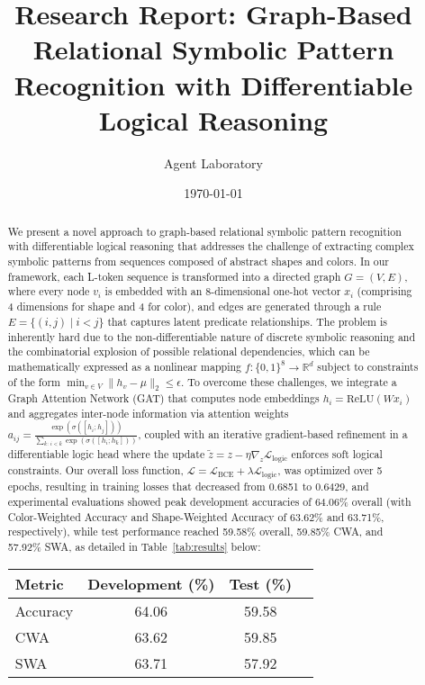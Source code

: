 \documentclass{article}
\title{Research Report: Graph-Based Relational Symbolic Pattern Recognition with Differentiable Logical Reasoning}
\author{Agent Laboratory}
\date{\today}
\begin{document}
\maketitle

\begin{abstract}
We present a novel approach to graph‐based relational symbolic pattern recognition with differentiable logical reasoning that addresses the challenge of extracting complex symbolic patterns from sequences composed of abstract shapes and colors. In our framework, each L-token sequence is transformed into a directed graph \( G = (V, E) \), where every node \( v_i \) is embedded with an 8-dimensional one-hot vector \( x_i \) (comprising 4 dimensions for shape and 4 for color), and edges are generated through a rule \( E = \{(i,j) \mid i < j\} \) that captures latent predicate relationships. The problem is inherently hard due to the non-differentiable nature of discrete symbolic reasoning and the combinatorial explosion of possible relational dependencies, which can be mathematically expressed as a nonlinear mapping \( f: \{0,1\}^8 \to \mathbb{R}^d \) subject to constraints of the form \( \min_{v \in V} \|h_v - \mu\|_2 \leq \epsilon \). To overcome these challenges, we integrate a Graph Attention Network (GAT) that computes node embeddings \( h_i = \text{ReLU}(W x_i) \) and aggregates inter-node information via attention weights \( a_{ij} = \frac{\exp(\sigma([h_i;h_j]))}{\sum_{k:\,i<k}\exp(\sigma([h_i;h_k]))} \), coupled with an iterative gradient-based refinement in a differentiable logic head where the update \( \tilde{z} = z - \eta \nabla_z \mathcal{L}_{\text{logic}} \) enforces soft logical constraints. Our overall loss function, \( \mathcal{L} = \mathcal{L}_{\text{BCE}} + \lambda \mathcal{L}_{\text{logic}} \), was optimized over 5 epochs, resulting in training losses that decreased from 0.6851 to 0.6429, and experimental evaluations showed peak development accuracies of 64.06\% overall (with Color-Weighted Accuracy and Shape-Weighted Accuracy of 63.62\% and 63.71\%, respectively), while test performance reached 59.58\% overall, 59.85\% CWA, and 57.92\% SWA, as detailed in Table~\ref{tab:results} below:\newline
\begin{tabular}{lccc}
\hline
Metric & Development (\%) & Test (\%) \\
\hline
Accuracy & 64.06 & 59.58 \\
CWA      & 63.62 & 59.85 \\
SWA      & 63.71 & 57.92 \\

\end{tabular}
\end{abstract}
\end{document}
